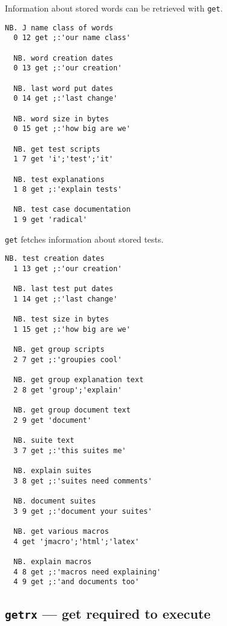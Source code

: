   Information about stored words can be retrieved with \texttt{get}.
  
\begin{lstlisting}[frame=single,framerule=0pt]
  NB. J name class of words
  0 12 get ;:'our name class' 
  
  NB. word creation dates
  0 13 get ;:'our creation'   
  
  NB. last word put dates
  0 14 get ;:'last change'    
  
  NB. word size in bytes
  0 15 get ;:'how big are we' 
  
  NB. get test scripts
  1 7 get 'i';'test';'it'  
     
  NB. test explanations
  1 8 get ;:'explain tests'   
  
  NB. test case documentation
  1 9 get 'radical'   
\end{lstlisting}         

  \texttt{get} fetches information about stored tests.
  
\begin{lstlisting}[frame=single,framerule=0pt]  
  NB. test creation dates
  1 13 get ;:'our creation'  
  
  NB. last test put dates 
  1 14 get ;:'last change' 
  
  NB. test size in bytes   
  1 15 get ;:'how big are we' 
  
  NB. get group scripts
  2 7 get ;:'groupies cool'  
  
  NB. get group explanation text
  2 8 get 'group';'explain'  
  
  NB. get group document text 
  2 9 get 'document'      
  
  NB. suite text    
  3 7 get ;:'this suites me'    
  
  NB. explain suites    
  3 8 get ;:'suites need comments'  
  
  NB. document suites
  3 9 get ;:'document your suites'  
  
  NB. get various macros
  4 get 'jmacro';'html';'latex'  
  
  NB. explain macros
  4 8 get ;:'macros need explaining'  
  4 9 get ;:'and documents too'     
\end{lstlisting}


\subsection{\texttt{getrx} ---  get required to execute}\label{ss:getrx}

